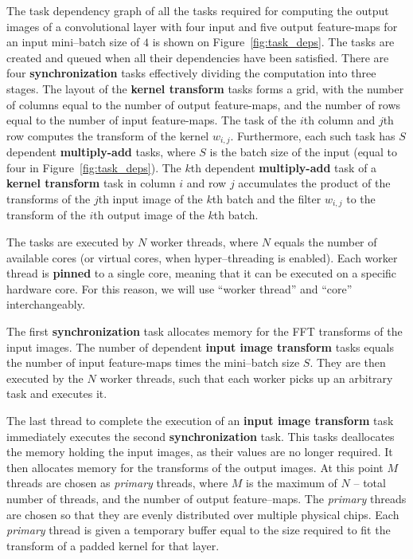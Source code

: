 \documentclass[conference]{IEEEtran}
\begin{document}
  {\color{zblack}}

  The task dependency graph of all the tasks required for computing
  the output images of a convolutional layer with four input and five
  output feature-maps for an input mini--batch size of $4$ is shown on
  Figure~\ref{fig:task_deps}.  The tasks are created and queued when
  all their dependencies have been satisfied.  There are four
  {\color{zyellow}\bf synchronization} tasks effectively dividing the
  computation into three stages.  The layout of the {\color{zblue}\bf
    kernel transform} tasks forms a grid, with the number of columns
  equal to the number of output feature-maps, and the number of rows
  equal to the number of input feature-maps.  The task of the $i$th
  column and $j$th row computes the transform of the kernel $w_{i,j}$.
  Furthermore, each such task has $S$ dependent {\color{zgreen}\bf
    multiply-add} tasks, where $S$ is the batch size of the input
  (equal to four in Figure~\ref{fig:task_deps}).  The $k$th dependent
  {\color{zgreen}\bf multiply-add} task of a {\color{zblue}\bf kernel
    transform} task in column $i$ and row $j$ accumulates the product
  of the transforms of the $j$th input image of the $k$th batch and
  the filter $w_{i,j}$ to the transform of the $i$th output image of
  the $k$th batch.

  The tasks are executed by $N$ worker threads, where $N$ equals the
  number of available cores (or virtual cores, when hyper--threading
  is enabled).  Each worker thread is {\bf pinned} to a single core,
  meaning that it can be executed on a specific hardware core.  For
  this reason, we will use ``worker thread'' and ``core''
  interchangeably.

  The first {\color{zyellow}\bf synchronization} task allocates memory
  for the FFT transforms of the input images.  The number of dependent
  {\color{zred}\bf input image transform} tasks equals the number of
  input feature-maps times the mini--batch size $S$.  They are then
  executed by the $N$ worker threads, such that each worker picks up
  an arbitrary task and executes it.

  The last thread to complete the execution of an {\color{zred}\bf
    input image transform} task immediately executes the second
  {\color{zyellow}\bf synchronization} task.  This tasks deallocates
  the memory holding the input images, as their values are no longer
  required. It then allocates memory for the transforms of the output
  images.  At this point $M$ threads are chosen as \emph{primary}
  threads, where $M$ is the maximum of $N$ -- total number of threads,
  and the number of output feature--maps.  The \emph{primary} threads
  are chosen so that they are evenly distributed over multiple
  physical chips.  Each \emph{primary} thread is given a temporary
  buffer equal to the size required to fit the transform of a padded
  kernel for that layer.
\end{document}
